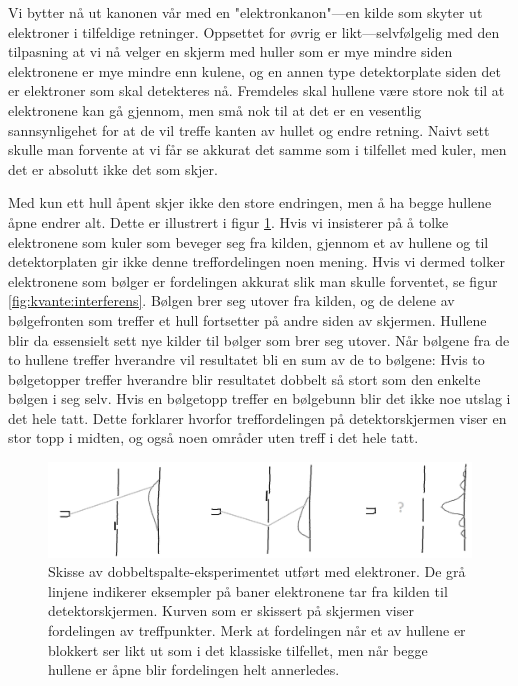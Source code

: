 Vi bytter nå ut kanonen vår med en "elektronkanon"---en kilde som skyter ut elektroner i tilfeldige retninger. Oppsettet for øvrig er likt---selvfølgelig med den tilpasning at vi nå velger en skjerm med huller som er mye mindre siden elektronene er mye mindre enn kulene, og en annen type detektorplate siden det er elektroner som skal detekteres nå. Fremdeles skal hullene være store nok til at elektronene kan gå gjennom, men små nok til at det er en vesentlig sannsynligehet for at de vil treffe kanten av hullet og endre retning. Naivt sett skulle man forvente at vi får se akkurat det samme som i tilfellet med kuler, men det er absolutt ikke det som skjer.

Med kun ett hull åpent skjer ikke den store endringen, men å ha begge hullene åpne endrer alt. Dette er illustrert i figur \ref{fig:kvante:kvantetreff}. Hvis vi insisterer på å tolke elektronene som kuler som beveger seg fra kilden, gjennom et av hullene og til detektorplaten gir ikke denne treffordelingen noen mening. Hvis vi dermed tolker elektronene som bølger er fordelingen akkurat slik man skulle forventet, se figur \ref{fig:kvante:interferens}. Bølgen brer seg utover fra kilden, og de delene av bølgefronten som treffer et hull fortsetter på andre siden av skjermen. Hullene blir da essensielt sett nye kilder til bølger som brer seg utover. Når bølgene fra de to hullene treffer hverandre vil resultatet bli en sum av de to bølgene: Hvis to bølgetopper treffer hverandre blir resultatet dobbelt så stort som den enkelte bølgen i seg selv. Hvis en bølgetopp treffer en bølgebunn blir det ikke noe utslag i det hele tatt. Dette forklarer hvorfor treffordelingen på detektorskjermen viser en stor topp i midten, og også noen områder uten treff i det hele tatt.

\begin{figure}[tp]
	\includegraphics[width=\textwidth]{./dobbeltspalte2}
	\caption{Skisse av dobbeltspalte-eksperimentet utført med elektroner. De grå linjene indikerer eksempler på baner elektronene tar fra kilden til detektorskjermen. Kurven som er skissert på skjermen viser fordelingen av treffpunkter. Merk at fordelingen når et av hullene er blokkert ser likt ut som i det klassiske tilfellet, men når begge hullene er åpne blir fordelingen helt annerledes.}
	\label{fig:kvante:kvantetreff}
\end{figure}

